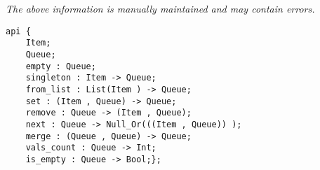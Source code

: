 \label{api:Typelocked\_Priority\_Queue}

{\tiny \it The above information is manually maintained and may contain errors.}
\begin{verbatim}
api {
    Item;
    Queue;
    empty : Queue;
    singleton : Item -> Queue;
    from_list : List(Item ) -> Queue;
    set : (Item , Queue) -> Queue;
    remove : Queue -> (Item , Queue);
    next : Queue -> Null_Or(((Item , Queue)) );
    merge : (Queue , Queue) -> Queue;
    vals_count : Queue -> Int;
    is_empty : Queue -> Bool;};
\end{verbatim}
